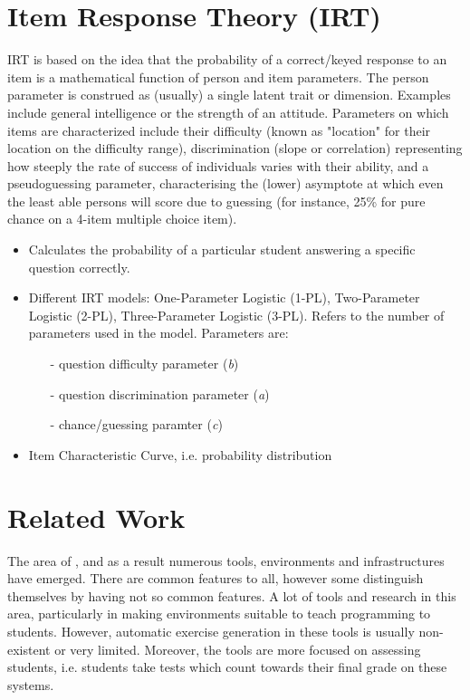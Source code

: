 \documentclass[11pt,a4paper]{report}
\begin{document}
\section{Item Response Theory (IRT)}
IRT is based on the idea that the probability of a correct/keyed response to an item is a mathematical function of person and item parameters. The person parameter is construed as (usually) a single latent trait or dimension. Examples include general intelligence or the strength of an attitude. Parameters on which items are characterized include their difficulty (known as "location" for their location on the difficulty range), discrimination (slope or correlation) representing how steeply the rate of success of individuals varies with their ability, and a pseudoguessing parameter, characterising the (lower) asymptote at which even the least able persons will score due to guessing (for instance, 25\% for pure chance on a 4-item multiple choice item).


\begin{itemize}
\item Calculates the probability of a particular student answering a specific question correctly.
\item Different IRT models: One-Parameter Logistic (1-PL), Two-Parameter Logistic (2-PL), Three-Parameter Logistic (3-PL). Refers to the number of parameters used in the model. Parameters are: 

\begin{itemize}
\item[-] question difficulty parameter (\textit{b})
\item[-] question discrimination parameter (\textit{a})
\item[-] chance/guessing paramter (\textit{c})
\end{itemize}

\item Item Characteristic Curve, i.e. probability distribution

\end{itemize}

\section{Related Work}
The area of , and as a result numerous tools, environments and infrastructures have emerged. There are common features to all, however some distinguish themselves by having not so common features.
A lot of tools and research in this area, particularly in making environments suitable to teach programming to students. However, automatic exercise generation in these tools is usually non-existent or very limited. Moreover, the tools are more focused on assessing students, i.e. students take tests which count towards their final grade on these systems.
\end{document}
